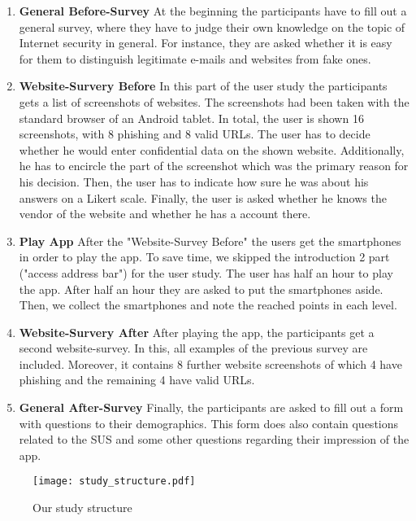\begin{enumerate}
	\item \textbf{General Before-Survey} At the beginning the participants have to fill out a general survey, where they have to judge their own knowledge on the topic of Internet security in general.
 For instance, they are asked whether it is easy for them to distinguish legitimate e-mails and websites from fake ones.

	\item \textbf{Website-Survery Before} In this part of the user study the participants gets a list of screenshots of websites.
 The screenshots had been taken with the standard browser of an Android tablet.
 In total, the user is shown 16 screenshots, with 8 phishing and 8 valid URLs.
 The user has to decide whether he would enter confidential data on the shown website.
 Additionally, he has to encircle the part of the screenshot which was the primary reason for his decision.
 Then, the user has to indicate how sure he was about his answers on a Likert scale.
 Finally, the user is asked whether he knows the vendor of the website and whether he has a account there.

	\item \textbf{Play App} After the "Website-Survey Before" the users get the smartphones in order to play the app.
 To save time, we skipped the introduction 2 part ("access address bar") for the user study.
 The user has half an hour to play the app.
 After half an hour they are asked to put the smartphones aside.
 Then, we collect the smartphones and note the reached points in each level.

	\item \textbf{Website-Survery After} After playing the app, the participants get a second website-survey.
 In this, all examples of the previous survey are included.
 Moreover, it contains 8 further website screenshots of which 4 have phishing and the remaining 4 have valid URLs.

	\item \textbf{General After-Survey} Finally, the participants are asked to fill out a form with questions to their demographics.
 This form does also contain questions related to the SUS and some other questions regarding their impression of the app.
\end{enumerate}



\begin{figure}[hHtbp]
\texttt{[image: study\_structure.pdf]}%
\caption{Our study structure}%
\label{fig:study_structure}%
\end{figure}
